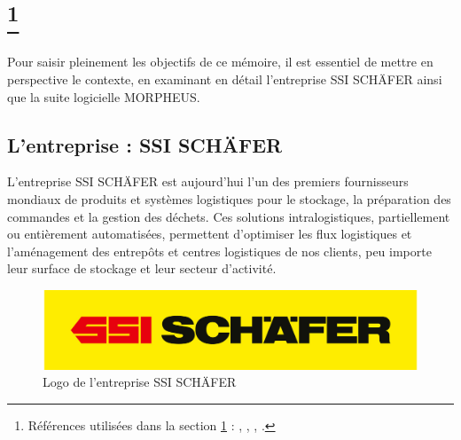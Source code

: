 \documentclass[a4paper, 12pt, french]{article}
\begin{document}
	




	\section[Contexte global]{ \footnote{Références utilisées dans la section \ref{section:context}  : \cite{schaefer}, \cite{schaeferHistory}, \cite{schaeferFR}, \cite{schaeferMorpheus}.}}\label{section:context}
		Pour saisir pleinement les objectifs de ce mémoire, il est essentiel de mettre en perspective le contexte, en examinant en détail l'entreprise SSI SCHÄFER ainsi que la suite logicielle MORPHEUS.%
	
		\subsection{L'entreprise : SSI SCHÄFER}
			L'entreprise SSI SCHÄFER est aujourd'hui l'un des premiers fournisseurs mondiaux de produits et systèmes logistiques pour le stockage, la préparation des commandes et la gestion des déchets. Ces solutions intralogistiques, partiellement ou entièrement automatisées, permettent d’optimiser les flux logistiques et l’aménagement des entrepôts et centres logistiques de nos clients, peu importe leur surface de stockage et leur secteur d’activité.

			\begin{figure}[h!]
				\begin{center}
					\includegraphics[width=0.7\linewidth]{images/schaefer.jpg}
				\end{center}
				\caption{Logo de l'entreprise SSI SCHÄFER}
				\label{fig:schaefer}
			\end{figure}	
		
\end{document}
